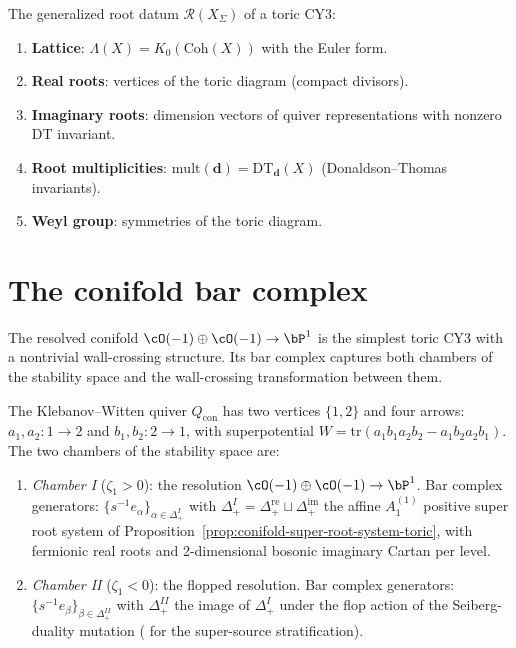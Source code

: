 The generalized root datum $\mathcal{R}(X_\Sigma)$ of a toric CY3:
\begin{enumerate}[label=(\roman*)]
 \item \textbf{Lattice}: $\Lambda(X) = K_0(\mathrm{Coh}(X))$ with the Euler form.
 \item \textbf{Real roots}: vertices of the toric diagram (compact divisors).
 \item \textbf{Imaginary roots}: dimension vectors of quiver representations with nonzero DT invariant.
 \item \textbf{Root multiplicities}: $\mathrm{mult}(\mathbf{d}) = \mathrm{DT}_\mathbf{d}(X)$ (Donaldson--Thomas invariants).
 \item \textbf{Weyl group}: symmetries of the toric diagram.
\end{enumerate}

\section{The conifold bar complex}
\label{sec:conifold-bar}

The resolved conifold $\cO(-1) \oplus \cO(-1) \to \bP^1$ is the simplest toric CY3 with a nontrivial wall-crossing structure. Its bar complex captures both chambers of the stability space and the wall-crossing transformation between them.

\begin{construction}
\label{constr:conifold-bar}
The Klebanov--Witten quiver $Q_{\mathrm{con}}$ has two vertices $\{1, 2\}$ and four arrows: $a_1, a_2 \colon 1 \to 2$ and $b_1, b_2 \colon 2 \to 1$, with superpotential $W = \mathrm{tr}(a_1 b_1 a_2 b_2 - a_1 b_2 a_2 b_1)$. The two chambers of the stability space are:
\begin{enumerate}[label=(\Roman*)]
 \item \emph{Chamber I} ($\zeta_1 > 0$): the resolution $\cO(-1) \oplus \cO(-1) \to \bP^1$. Bar complex generators: $\{s^{-1} e_\alpha\}_{\alpha \in \Delta_+^I}$ with $\Delta_+^I = \Delta_+^{\mathrm{re}} \sqcup \Delta_+^{\mathrm{im}}$ the affine $A_1^{(1)}$ positive super root system of Proposition~\ref{prop:conifold-super-root-system-toric}, with fermionic real roots and 2-dimensional bosonic imaginary Cartan per level.
 \item \emph{Chamber II} ($\zeta_1 < 0$): the flopped resolution. Bar complex generators: $\{s^{-1} e_\beta\}_{\beta \in \Delta_+^{II}}$ with $\Delta_+^{II}$ the image of $\Delta_+^I$ under the flop action of the Seiberg-duality mutation ( for the super-source stratification).
\end{enumerate}
\end{construction}

